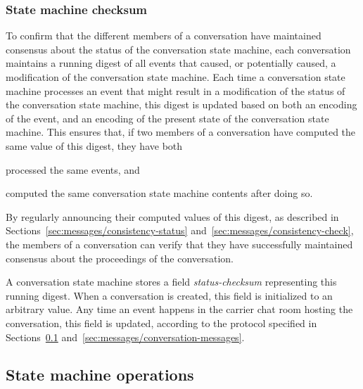 \documentclass{article}
\def\smfield#1{\textsl{#1}}
\begin{document}


\subsubsection{State machine checksum}
\label{sec:conversation-state-machine/contents/checksum}

To confirm that the different members of a conversation have maintained consensus about the status of the conversation state machine, each conversation maintains a running digest of all events that caused, or potentially caused, a modification of the conversation state machine.
Each time a conversation state machine processes an event that might result in a modification of the status of the conversation state machine, this digest is updated based on both an encoding of the event, and an encoding of the present state of the conversation state machine.
This ensures that, if two members of a conversation have computed the same value of this digest, they have both
\begin{enumerate*}[label={(\alph*)}]
\item processed the same events, and
\item computed the same conversation state machine contents after doing so.
\end{enumerate*}
By regularly announcing their computed values of this digest, as described in Sections~\ref{sec:messages/consistency-status} and~\ref{sec:messages/consistency-check}, the members of a conversation can verify that they have successfully maintained consensus about the proceedings of the conversation.


A conversation state machine stores a field \smfield{status-checksum} representing this running digest.
When a conversation is created, this field is initialized to an arbitrary value.
Any time an event happens in the carrier chat room hosting the conversation, this field is updated, according to the protocol specified in Sections~\ref{sec:conversation-state-machine/operations} and~\ref{sec:messages/conversation-messages}.


\subsection{State machine operations}
\label{sec:conversation-state-machine/operations}
\end{document}
